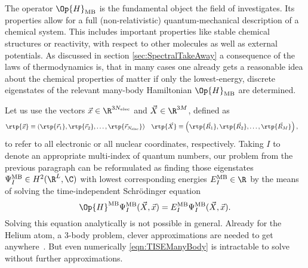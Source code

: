 The operator $\Op{H}_\text{MB}$ is the fundamental object
the field of  investigates.
Its properties allow for a full
(non-relativistic) quantum-mechanical description
of a chemical system.
This includes important properties like stable chemical structures
or reactivity, with respect to other molecules as well as external potentials.
As discussed in section \vref{sec:SpectralTakeAway}
a consequence of the laws of thermodynamics is,
that in many cases one already gets
a reasonable idea about the chemical properties of matter
if only the lowest-energy, discrete eigenstates of the relevant
many-body Hamiltonian $\Op{H}_\text{MB}$ are determined.

Let us use the vectors $\vec{x} \in \R^{3\Nelec}$ and $\vec{X} \in \R^{3M}$, defined as
\begin{align}
	\rtp{\vec{x}} &\equiv \left(\rtp{\vec{r}_1}, \rtp{\vec{r}_2}, \ldots, \rtp{\vec{r}_{\Nelec}}\right)
	&
	\rtp{\vec{X}} &\equiv \left(\rtp{\vec{R}_1}, \rtp{\vec{R}_2}, \ldots, \rtp{\vec{R}_{M}}\right),
	\label{eqn:DefAllCoords}
\end{align}
to refer to all electronic or all nuclear coordinates, respectively.
Taking $I$ to denote an appropriate multi-index of quantum numbers,
our problem from the previous paragraph can be reformulated
as finding those eigenstates $\Psi^\text{MB}_I \in H^2(\R^L, \C)$
with lowest corresponding energies $E^\text{MB}_I \in \R$
by the means of solving the time-independent Schrödinger equation
\begin{equation}
	\Op{H}^\text{MB} \Psi_I^\text{MB}(\vec{X}, \vec{x})
	= E_I^\text{MB} \Psi_I^\text{MB}(\vec{X}, \vec{x}).
	\label{eqn:TISEManyBody}
\end{equation}
Solving this equation analytically is not possible in general.
Already for the Helium atom, a 3-body problem, clever approximations are needed
to get anywhere~\cite{Hylleraas1929}.
But even numerically \eqref{eqn:TISEManyBody} is intractable to solve
without further approximations.

